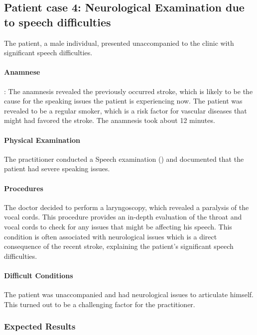 \subsection{Patient case 4: Neurological Examination due to speech difficulties}\label{subsec:patient-case-4:-neurological-examination-due-to-speech-difficulties}
The patient, a male individual, presented unaccompanied to the clinic with significant speech difficulties.

\paragraph{Anamnese}:
The anamnesis revealed the previously occurred stroke, which is likely to be the cause for the speaking issues the patient is experiencing now.
The patient was revealed to be a regular smoker, which is a risk factor for vascular diseases that might had favored the stroke.
The anamnesis took about 12 minutes.

\paragraph{Physical Examination}
The practitioner conducted a Speech examination () and documented that the patient had severe speaking issues.

\paragraph{Procedures}
The doctor decided to perform a laryngoscopy, which revealed a paralysis of the vocal cords.
This procedure provides an in-depth evaluation of the throat and vocal cords to check for any issues that might be affecting his speech.
This condition is often associated with neurological issues which is a direct consequence of the recent stroke,
explaining the patient's significant speech difficulties.

\paragraph{Difficult Conditions}
The patient was unaccompanied and had neurological issues to articulate himself.
This turned out to be a challenging factor for the practitioner.

\subsubsection{Expected Results}

